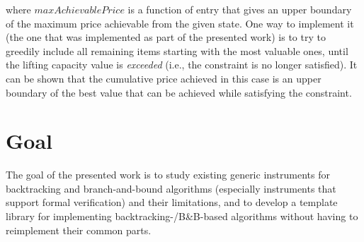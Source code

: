 where $maxAchievablePrice$ is a function of entry that gives an upper boundary of the maximum
price achievable from the given state. One way to implement it (the one that was implemented
as part of the presented work) is to try to greedily include all remaining items starting with
the
most valuable ones, until the lifting capacity value is \emph{exceeded} (i.e., the constraint
is no longer satisfied). It can be shown that the cumulative price achieved in this case is
an upper boundary of the best value that can be achieved while satisfying the constraint.

\section{Goal}

The goal of the presented work is to study existing generic instruments for
backtracking and branch-and-bound algorithms (especially instruments that support formal
verification) and their limitations, and to develop a template library for implementing
backtracking-/B\&B-based algorithms without having to reimplement their common parts.





